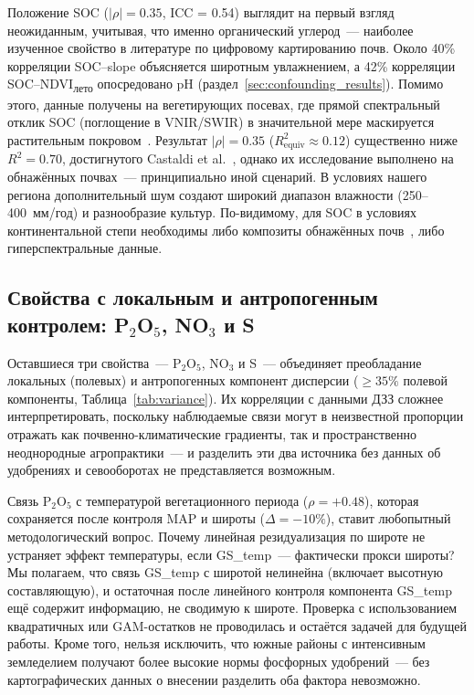 Положение SOC ($|\rho| = 0.35$, ICC = 0.54) выглядит на первый взгляд неожиданным, учитывая, что именно органический углерод~--- наиболее изученное свойство в литературе по цифровому картированию почв. Около 40\% корреляции SOC--slope объясняется широтным увлажнением, а 42\% корреляции SOC--NDVI\textsubscript{лето} опосредовано pH (раздел~\ref{sec:confounding_results}). Помимо этого, данные получены на вегетирующих посевах, где прямой спектральный отклик SOC (поглощение в VNIR/SWIR) в значительной мере маскируется растительным покровом~\citep{Stenberg2010}. Результат $|\rho| = 0.35$ ($R^2_{\text{equiv}} \approx 0.12$) существенно ниже $R^2 = 0.70$, достигнутого Castaldi et al.~\citep{Castaldi2019}, однако их исследование выполнено на обнажённых почвах~--- принципиально иной сценарий. В условиях нашего региона дополнительный шум создают широкий диапазон влажности (250--400~мм/год) и разнообразие культур. По-видимому, для SOC в условиях континентальной степи необходимы либо композиты обнажённых почв~\citep{Silvero2021, Dvornikov2021}, либо гиперспектральные данные.

\subsection{Свойства с локальным и антропогенным контролем: P$_2$O$_5$, NO$_3$ и S}

Оставшиеся три свойства~--- P$_2$O$_5$, NO$_3$ и S~--- объединяет преобладание локальных (полевых) и антропогенных компонент дисперсии ($\geq 35\%$ полевой компоненты, Таблица~\ref{tab:variance}). Их корреляции с данными ДЗЗ сложнее интерпретировать, поскольку наблюдаемые связи могут в неизвестной пропорции отражать как почвенно-климатические градиенты, так и пространственно неоднородные агропрактики~--- и разделить эти два источника без данных об удобрениях и севооборотах не представляется возможным.

Связь P$_2$O$_5$ с температурой вегетационного периода ($\rho = +0.48$), которая сохраняется после контроля MAP и широты ($\Delta = -10\%$), ставит любопытный методологический вопрос. Почему линейная резидуализация по широте не устраняет эффект температуры, если GS\_temp~--- фактически прокси широты? Мы полагаем, что связь GS\_temp с широтой нелинейна (включает высотную составляющую), и остаточная после линейного контроля компонента GS\_temp ещё содержит информацию, не сводимую к широте. Проверка с использованием квадратичных или GAM-остатков не проводилась и остаётся задачей для будущей работы. Кроме того, нельзя исключить, что южные районы с интенсивным земледелием получают более высокие нормы фосфорных удобрений~--- без картографических данных о внесении разделить оба фактора невозможно.


